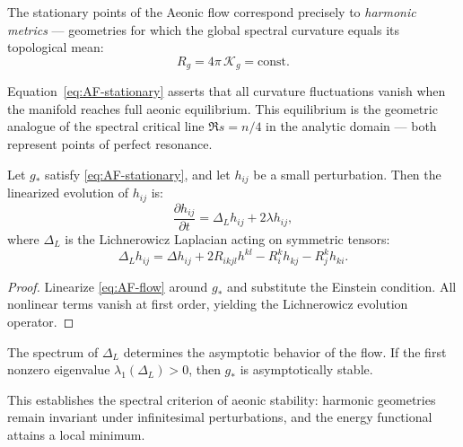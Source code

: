 \begin{corollary}
The stationary points of the Aeonic flow correspond precisely
to \emph{harmonic metrics} — geometries
for which the global spectral curvature equals its topological mean:
\[
R_g = 4\pi\,\mathcal{K}_g = \text{const.}
\]
\end{corollary}

\begin{remark}
Equation~\eqref{eq:AF-stationary}
asserts that all curvature fluctuations vanish
when the manifold reaches full aeonic equilibrium.
This equilibrium is the geometric analogue of the spectral critical line
\(\Re s = n/4\)
in the analytic domain — both represent points of perfect resonance.
\end{remark}


\begin{theorem}
\label{thm:AF-stability}
Let \(g_*\) satisfy \eqref{eq:AF-stationary},
and let \(h_{ij}\) be a small perturbation.
Then the linearized evolution of \(h_{ij}\) is:
\begin{equation}
\label{eq:AF-linear}
\frac{\partial h_{ij}}{\partial t}
=
\Delta_L h_{ij} + 2\lambda h_{ij},
\end{equation}
where \(\Delta_L\)
is the Lichnerowicz Laplacian acting on symmetric tensors:
\[
\Delta_L h_{ij}
=
\Delta h_{ij} + 2R_{ikjl}h^{kl} - R_i^k h_{kj} - R_j^k h_{ki}.
\]
\end{theorem}

\begin{proof}
Linearize \eqref{eq:AF-flow} around \(g_*\)
and substitute the Einstein condition.
All nonlinear terms vanish at first order,
yielding the Lichnerowicz evolution operator.
\end{proof}

\begin{corollary}
The spectrum of \(\Delta_L\)
determines the asymptotic behavior of the flow.
If the first nonzero eigenvalue \(\lambda_1(\Delta_L) > 0\),
then \(g_*\) is asymptotically stable.
\end{corollary}

\begin{remark}
This establishes the spectral criterion of aeonic stability:
harmonic geometries remain invariant under infinitesimal perturbations,
and the energy functional attains a local minimum.
\end{remark}

